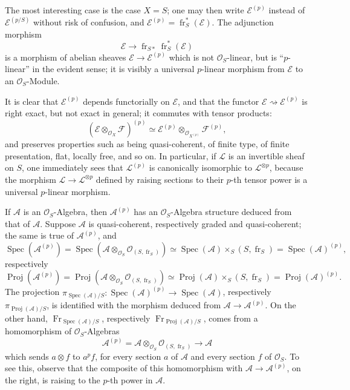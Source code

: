 \documentclass[11pt]{article}
\DeclareMathOperator{\Spec}{Spec}
\providecommand{\OO}{\mathcal{O}}
\providecommand{\cE}{\mathcal E}
\providecommand{\cF}{\mathcal F}
\providecommand{\Spec}{\operatorname{Spec}}
\providecommand{\Spec}{\operatorname{Spec}}
\providecommand{\Spec}{\operatorname{Spec}}
\providecommand{\fr}{\operatorname{fr}}
\providecommand{\Fr}{\operatorname{Fr}}
\providecommand{\Proj}{\operatorname{Proj}}
\providecommand{\cL}{\mathcal L}
\providecommand{\Fr}{\operatorname{Fr}}
\providecommand{\fr}{\operatorname{fr}}
\providecommand{\Spec}{\operatorname{Spec}}
\begin{document}
The most interesting case is the case $X=S$; one may then write $\cE^{(p)}$ instead of $\cE^{(p/S)}$ without risk of confusion, and $\cE^{(p)}=\fr_S^*(\cE)$. The adjunction morphism
\[
\cE\longrightarrow \fr_{S*}\fr_S^*(\cE)
\]
is a morphism of abelian sheaves $\cE\to\cE^{(p)}$ which is not $\OO_S$-linear, but is ``$p$-linear'' in the evident sense; it is visibly a universal $p$-linear morphism from $\cE$ to an $\OO_S$-Module.

It is clear that $\cE^{(p)}$ depends functorially on $\cE$, and that the functor $\cE\rightsquigarrow\cE^{(p)}$ is right exact, but not exact in general; it commutes with tensor products:
\[
(\cE\otimes_{\OO_X}\cF)^{(p)}\simeq
\cE^{(p)}\otimes_{\OO_{X^{(p)}}}\cF^{(p)},
\]
and preserves properties such as being quasi-coherent, of finite type, of finite presentation, flat, locally free, and so on. In particular, if $\cL$ is an invertible sheaf on $S$, one immediately sees that $\cL^{(p)}$ is canonically isomorphic to $\cL^{\otimes p}$, because the morphism $\cL\to\cL^{\otimes p}$ defined by raising sections to their $p$-th tensor power is a universal $p$-linear morphism.

If $\mathcal{A}$ is an $\OO_S$-Algebra, then $\mathcal{A}^{(p)}$ has an $\OO_S$-Algebra structure deduced from that of $\mathcal{A}$. Suppose $\mathcal{A}$ is quasi-coherent, respectively graded and quasi-coherent; the same is true of $\mathcal{A}^{(p)}$, and
\[
\Spec(\mathcal{A}^{(p)})=\Spec(\mathcal{A}\otimes_{\OO_S}\OO_{(S,\fr_S)})
 \simeq \Spec(\mathcal{A})\times_S(S,\fr_S)=\Spec(\mathcal{A})^{(p)},
\]
respectively
\[
\Proj(\mathcal{A}^{(p)})=\Proj(\mathcal{A}\otimes_{\OO_S}\OO_{(S,\fr_S)})
 \simeq \Proj(\mathcal{A})\times_S(S,\fr_S)=\Proj(\mathcal{A})^{(p)}.
\]
The projection $\pi_{\Spec(\mathcal{A})/S}:\Spec(\mathcal{A})^{(p)}\to\Spec(\mathcal{A})$, respectively $\pi_{\Proj(\mathcal{A})/S}$, is identified with the morphism deduced from $\mathcal{A}\to\mathcal{A}^{(p)}$. On the other hand, $\Fr_{\Spec(\mathcal{A})/S}$, respectively $\Fr_{\Proj(\mathcal{A})/S}$, comes from a homomorphism of $\OO_S$-Algebras
\[
\mathcal{A}^{(p)}=\mathcal{A}\otimes_{\OO_S}\OO_{(S,\fr_S)}\longrightarrow \mathcal{A}
\]
which sends $a\otimes f$ to $a^p f$, for every section $a$ of $\mathcal{A}$ and every section $f$ of $\OO_S$. To see this, observe that the composite of this homomorphism with $\mathcal{A}\to\mathcal{A}^{(p)}$, on the right, is raising to the $p$-th power in $\mathcal{A}$.
\end{document}
